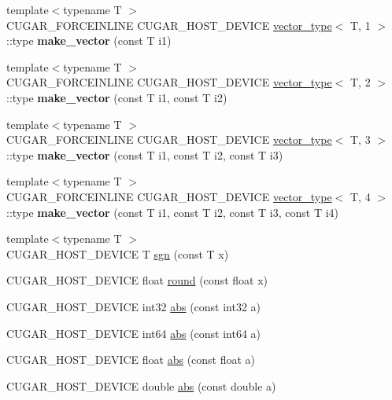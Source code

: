 \begin{DoxyCompactItemize}
\item 
{\footnotesize template$<$typename T $>$ }\\C\+U\+G\+A\+R\+\_\+\+F\+O\+R\+C\+E\+I\+N\+L\+I\+NE C\+U\+G\+A\+R\+\_\+\+H\+O\+S\+T\+\_\+\+D\+E\+V\+I\+CE \hyperlink{structcugar_1_1vector__type}{vector\+\_\+type}$<$ T, 1 $>$\+::type {\bfseries make\+\_\+vector} (const T i1)
\item 
{\footnotesize template$<$typename T $>$ }\\C\+U\+G\+A\+R\+\_\+\+F\+O\+R\+C\+E\+I\+N\+L\+I\+NE C\+U\+G\+A\+R\+\_\+\+H\+O\+S\+T\+\_\+\+D\+E\+V\+I\+CE \hyperlink{structcugar_1_1vector__type}{vector\+\_\+type}$<$ T, 2 $>$\+::type {\bfseries make\+\_\+vector} (const T i1, const T i2)
\item 
{\footnotesize template$<$typename T $>$ }\\C\+U\+G\+A\+R\+\_\+\+F\+O\+R\+C\+E\+I\+N\+L\+I\+NE C\+U\+G\+A\+R\+\_\+\+H\+O\+S\+T\+\_\+\+D\+E\+V\+I\+CE \hyperlink{structcugar_1_1vector__type}{vector\+\_\+type}$<$ T, 3 $>$\+::type {\bfseries make\+\_\+vector} (const T i1, const T i2, const T i3)
\item 
{\footnotesize template$<$typename T $>$ }\\C\+U\+G\+A\+R\+\_\+\+F\+O\+R\+C\+E\+I\+N\+L\+I\+NE C\+U\+G\+A\+R\+\_\+\+H\+O\+S\+T\+\_\+\+D\+E\+V\+I\+CE \hyperlink{structcugar_1_1vector__type}{vector\+\_\+type}$<$ T, 4 $>$\+::type {\bfseries make\+\_\+vector} (const T i1, const T i2, const T i3, const T i4)
\item 
{\footnotesize template$<$typename T $>$ }\\C\+U\+G\+A\+R\+\_\+\+H\+O\+S\+T\+\_\+\+D\+E\+V\+I\+CE T \hyperlink{group___basic_gaf4597603074c709d435ea876eac59e1b}{sgn} (const T x)
\item 
C\+U\+G\+A\+R\+\_\+\+H\+O\+S\+T\+\_\+\+D\+E\+V\+I\+CE float \hyperlink{group___basic_gaea9bbfe8e98f49d1754e26b52b37f9e2}{round} (const float x)
\item 
C\+U\+G\+A\+R\+\_\+\+H\+O\+S\+T\+\_\+\+D\+E\+V\+I\+CE int32 \hyperlink{group___basic_gafc4cc49011584e022dbf9c13fa7b95ee}{abs} (const int32 a)
\item 
C\+U\+G\+A\+R\+\_\+\+H\+O\+S\+T\+\_\+\+D\+E\+V\+I\+CE int64 \hyperlink{group___basic_gad4c63fa8a391708719f2a5dff73fa25a}{abs} (const int64 a)
\item 
C\+U\+G\+A\+R\+\_\+\+H\+O\+S\+T\+\_\+\+D\+E\+V\+I\+CE float \hyperlink{group___basic_gaa2016bab6ca9f9043a7251b64daa0941}{abs} (const float a)
\item 
C\+U\+G\+A\+R\+\_\+\+H\+O\+S\+T\+\_\+\+D\+E\+V\+I\+CE double \hyperlink{group___basic_ga6f625f0822c168a5fbea5dccd0a515fc}{abs} (const double a)

\end{DoxyCompactItemize}
